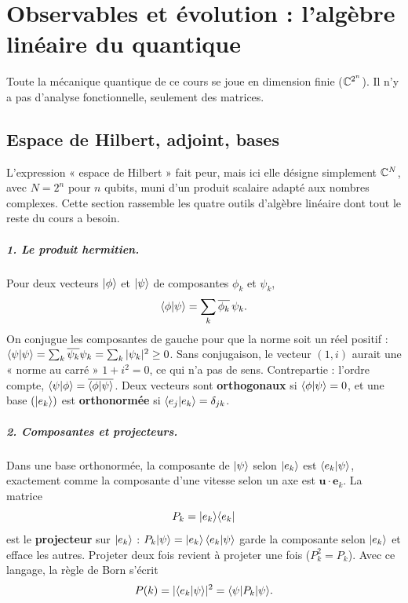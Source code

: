 \chapter{Observables et évolution : l'algèbre linéaire du quantique}\label{ch:algebre}

Toute la mécanique quantique de ce cours se joue en dimension finie ($\mathbb{C}^{2^n}$). Il n'y a pas d'analyse fonctionnelle, seulement des matrices.

\section{Espace de Hilbert, adjoint, bases}
L'expression « espace de Hilbert » fait peur, mais ici elle désigne simplement $\mathbb{C}^N$, avec $N=2^n$ pour $n$ qubits, muni d'un produit scalaire adapté aux nombres complexes. Cette section rassemble les quatre outils d'algèbre linéaire dont tout le reste du cours a besoin.

\paragraph{1. Le produit hermitien.} Pour deux vecteurs $\lvert \phi\rangle$ et $\lvert \psi\rangle$ de composantes $\phi_k$ et $\psi_k$,
\[
\langle \phi\vert \psi\rangle=\sum_k\overline{\phi_k}\,\psi_k .
\]
On conjugue les composantes de gauche pour que la norme soit un réel positif : $\langle \psi\vert \psi\rangle=\sum_k\overline{\psi_k}\psi_k=\sum_k|\psi_k|^2\ge0$. Sans conjugaison, le vecteur $(1,i)$ aurait une « norme au carré » $1+i^2=0$, ce qui n'a pas de sens. Contrepartie : l'ordre compte, $\langle \psi\vert \phi\rangle=\overline{\langle \phi\vert \psi\rangle}$. Deux vecteurs sont \textbf{orthogonaux} si $\langle \phi\vert \psi\rangle=0$, et une base $(\lvert e_k\rangle)$ est \textbf{orthonormée} si $\langle e_j\vert e_k\rangle=\delta_{jk}$.

\paragraph{2. Composantes et projecteurs.} Dans une base orthonormée, la composante de $\lvert \psi\rangle$ selon $\lvert e_k\rangle$ est $\langle e_k\vert \psi\rangle$, exactement comme la composante d'une vitesse selon un axe est $\mathbf u\cdot\mathbf e_k$. La matrice
\[
P_k=\lvert e_k\rangle\langle e_k\rvert
\]
est le \textbf{projecteur} sur $\lvert e_k\rangle$ : $P_k\lvert \psi\rangle=\lvert e_k\rangle\,\langle e_k\vert \psi\rangle$ garde la composante selon $\lvert e_k\rangle$ et efface les autres. Projeter deux fois revient à projeter une fois ($P_k^2=P_k$). Avec ce langage, la règle de Born s'écrit
\[
P(k)=|\langle e_k\vert \psi\rangle|^2=\langle \psi\rvert P_k\lvert \psi\rangle .
\]

